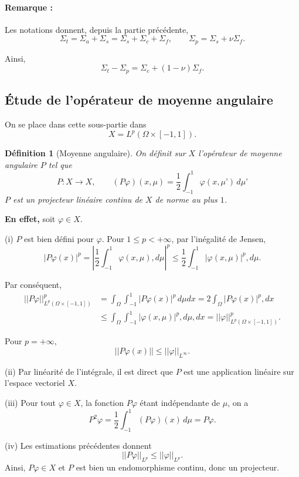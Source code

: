 \documentclass{article}
\newtheorem{definition}[theorem]{Définition}
\begin{document}
\paragraph{Remarque :}
Les notations donnent, depuis la partie précédente,
\[
\Sigma_t = \Sigma_a+\Sigma_s =\Sigma_s+\Sigma_c+\Sigma_f,
\qquad
\Sigma_p =\Sigma_s+\nu\Sigma_f.
\]

Ainsi,
\[
\Sigma_t-\Sigma_p =\Sigma_c+(1-\nu)\Sigma_f.
\]

\subsection{Étude de l’opérateur de moyenne angulaire}

On se place dans cette sous-partie dans
\[
X=L^p(\Omega\times[-1,1]).
\]

\begin{definition}[Moyenne angulaire]
    On définit sur $X$ l’opérateur de moyenne angulaire $P$ tel que
\[
P:X\longrightarrow X, \qquad (P\varphi)(x,\mu) =\frac12 \int_{-1}^1 \varphi(x,\mu’)\,d\mu’
\]
$P$ est un projecteur linéaire continu de $X$ de norme au plus $1$.
\end{definition} 


\bigskip
\textbf{En effet,} soit $\varphi\in X$.

\medskip
(i) $P$ est bien défini pour $\varphi$. Pour $1\leq p<+\infty$, par l’inégalité de Jensen,
\[ |P\varphi(x)|^p =\left|\frac12\int_{-1}^1\varphi(x,\mu),d\mu\right|^p
\leq \frac12\int_{-1}^1 |\varphi(x,\mu)|^p,d\mu.
\]

Par conséquent,
\begin{align*}
    ||P\varphi||_{L^p(\Omega\times[-1,1])}^p &= \int_{\Omega}\!\int_{-1}^1 |P\varphi(x)|^p\,d\mu dx = 2\int_\Omega |P\varphi(x)|^p,dx \\
    &\leq \int_{\Omega}\!\int_{-1}^1 |\varphi(x,\mu)|^p,d\mu,dx     =||\varphi||_{L^p(\Omega\times[-1,1])}^p.
\end{align*}

Pour $p=+\infty$,
\[ ||P\varphi(x)|| \leq ||\varphi||_{L^\infty}.\]

(ii) Par linéarité de l’intégrale, il est direct que $P$ est une application linéaire sur l’espace vectoriel $X$.

(iii) Pour tout $\varphi\in X$, la fonction $P\varphi$ étant indépendante de $\mu$, on a
\[
P^2\varphi = \frac12 \int_{-1}^1(P\varphi)(x)\,d\mu =P\varphi.
\]

(iv) Les estimations précédentes donnent
\[||P\varphi||_{L^p} \leq ||\varphi||_{L^p}.
\]
Ainsi, $P\varphi\in X$ et $P$ est bien un endomorphisme continu, donc un projecteur.
\end{document}
